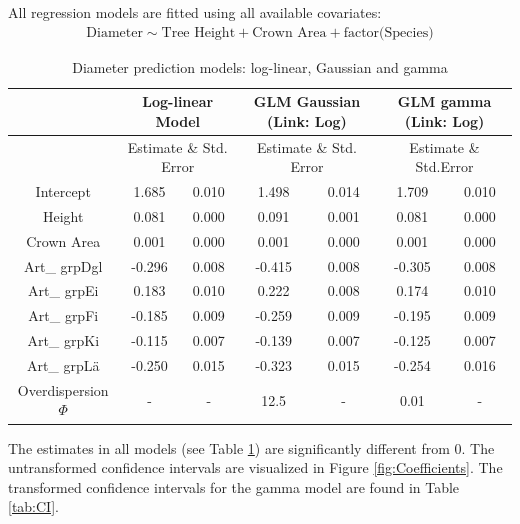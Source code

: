 

All regression models are fitted using all available covariates: 
\begin{align*}
\text{Diameter} \sim \text{Tree Height} + \text{Crown Area} + \text{factor(Species)}
\end{align*}

\begin{table}[H]
\setlength\arrayrulewidth{1pt}
\centering

\begin{adjustbox}{max width=\textwidth}
\begin{tabular}{|c| c c| c c| c c|}
\hline
\rowcolor{SeaBlue}
 \multicolumn{1}{|c|}{\textbf{Coefficients}} &  \multicolumn{2}{|c|}{\textbf{Log-linear Model}} &  \multicolumn{2}{|c|}{\textbf{GLM Gaussian (Link: Log)}} &  \multicolumn{2}{|c|}{\textbf{GLM gamma (Link: Log)}}  \\
\hline 
\rowcolor{Gray}
\multicolumn{1}{|c|}{-} & \multicolumn{2}{|c|}{Estimate \& Std. Error} & \multicolumn{2}{|c|}{Estimate \& Std. Error} & \multicolumn{2}{|c|}{Estimate \& Std.Error} \\ 
\hline 
Intercept & 1.685 & 0.010 & 1.498 & 0.014 & 1.709 & 0.010 \\ 
\hline 
Height & 0.081 & 0.000 & 0.091 & 0.001 & 0.081 & 0.000 \\ 
\hline 
Crown Area & 0.001 & 0.000 & 0.001 & 0.000 & 0.001 & 0.000 \\ 
\hline 
Art\_ grpDgl & -0.296 & 0.008 & -0.415 & 0.008 & -0.305 & 0.008 \\ 
\hline 
Art\_ grpEi & 0.183 & 0.010 & 0.222 & 0.008 & 0.174 & 0.010 \\ 
\hline 
Art\_ grpFi & -0.185 & 0.009 & -0.259 & 0.009 & -0.195 & 0.009 \\ 
\hline 
Art\_ grpKi & -0.115 & 0.007 & -0.139 & 0.007 & -0.125 & 0.007 \\ 
\hline 
Art\_ grpLä & -0.250 & 0.015 & -0.323 & 0.015 & -0.254 & 0.016 \\ 
\hline 
Overdispersion $\Phi$ & - & - & 12.5 & - & 0.01 & - \\ 
\hline 
\end{tabular} 
\end{adjustbox}

\caption{Diameter prediction models: log-linear, Gaussian and gamma}
\label{tab:Prediction Models}

\end{table}

The estimates in all models (see Table \ref{tab:Prediction Models}) are significantly different from 0. The untransformed confidence
intervals are visualized in Figure \ref{fig:Coefficients}. The transformed confidence intervals for the gamma model are found in
Table \ref{tab:CI}.

